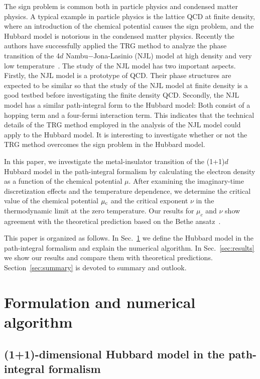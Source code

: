 \documentclass[nofootinbib,prd,aps,superscriptaddress,preprintnumbers,twocolumn,showpacs]{revtex4-1}
\begin{document}
The sign problem is common both in particle physics and condensed matter physics. A typical example in particle physics is the lattice QCD at finite density, where an introduction of the chemical potential causes the sign problem, and the Hubbard model is notorious in the condensed matter physics.
Recently the authors have successfully applied the TRG method to analyze the phase transition of the 4$d$ Nambu$-$Jona-Lasinio (NJL) model at high density and very low temperature~\cite{Akiyama:2020soe}. The study of the NJL model has two important aspects. Firstly, the NJL model is a prototype of QCD. Their phase structures are expected to be similar so that the study of the NJL model at finite density is a good testbed before investigating the finite density QCD. Secondly, the NJL model has a similar path-integral form to the Hubbard model: Both consist of a hopping term and a four-fermi interaction term. This indicates that the technical details of the TRG method employed in the analysis of the NJL model could apply to the Hubbard model. It is interesting to investigate whether or not the TRG method overcomes the sign problem in the Hubbard model.

In this paper, we investigate the metal-insulator transition of the (1+1)$d$ Hubbard model in the path-integral formalism by calculating the electron density as a function of the chemical potential $\mu$. After examining the imaginary-time discretization effects and the temperature dependence, we determine the critical value of the chemical potential $\mu_{\rm c}$ and the critical exponent $\nu$ in the thermodynamic limit at the zero temperature. Our results for $\mu_c$ and $\nu$ show agreement with the theoretical prediction based on the Bethe ansatz~\cite{PhysRevLett.20.1445,LIEB20031}.

This paper is organized as follows. In Sec.~\ref{sec:method} we define the Hubbard model in the path-integral formalism and explain the numerical algorithm. In Sec.~\ref{sec:results} we show our results and compare them with theoretical predictions.  Section~\ref{sec:summary} is devoted to summary and outlook.


\section{Formulation and numerical algorithm}
\label{sec:method}

\subsection{(1+1)-dimensional Hubbard model in the path-integral formalism}
\label{subsec:action}
\end{document}
